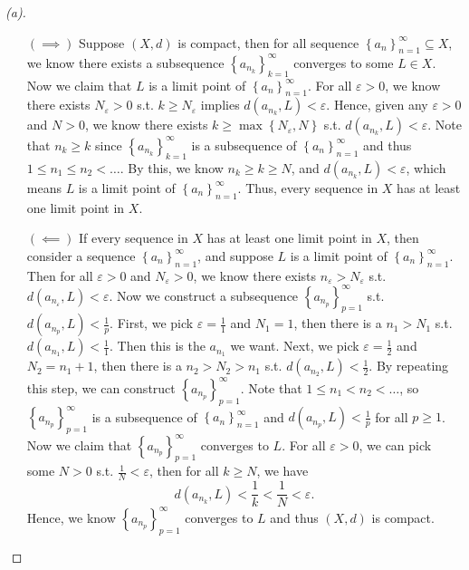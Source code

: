 \begin{proof}[(a)]
  \vphantom{text}
  \begin{itemize}
    \item [\((\implies )\)] Suppose \((X, d)\) is compact, then for all sequence \(\left\{ a_n \right\}_{n=1}^{\infty} \subseteq X \), we know there exists a subsequence \(\left\{ a_{n_k} \right\}_{k=1}^{\infty}  \) converges to some \(L \in X\). Now we claim that \(L\) is a limit point of \(\left\{ a_n \right\}_{n=1}^{\infty}  \). For all \(\varepsilon > 0\), we know there exists \(N_{\varepsilon } > 0\) s.t. \(k \ge N_{\varepsilon }\) implies \(d \left( a_{n_k}, L \right) < \varepsilon  \). Hence, given any \(\varepsilon > 0\) and \(N > 0\), we know there exists \(k \ge \max \left\{ N_{\varepsilon }, N  \right\} \) s.t. \(d \left( a_{n_k}, L \right) < \varepsilon  \). Note that \(n_k \ge k\)  since \(\left\{ a_{n_k} \right\}_{k=1}^{\infty}  \) is a subsequence of \(\left\{ a_n \right\}_{n=1}^{\infty}  \) and thus \(1 \le n_1 \le n_2 < \dots \). By this, we know \(n_k \ge k \ge N\), and \(d \left( a_{n_k}, L \right) < \varepsilon  \), which means \(L\) is a limit point of \(\left\{ a_n \right\}_{n=1}^{\infty}  \). Thus, every sequence in \(X\) has at least one limit point in \(X\).                      
    \item [\((\impliedby )\)] If every sequence in \(X\) has at least one limit point in \(X\), then consider a sequence \(\left\{ a_n \right\}_{n=1}^{\infty}  \), and suppose \(L\) is a limit point of \(\left\{ a_n \right\}_{n=1}^{\infty}  \). Then for all \(\varepsilon > 0\) and \(N_{\varepsilon } > 0 \), we know there exists \(n_{\varepsilon } > N_{\varepsilon }\) s.t. \(d\left( a_{n_{\varepsilon }}, L \right) < \varepsilon \). Now we construct a subsequence \(\left\{ a_{n_p} \right\}_{p=1}^{\infty}  \) s.t. \(d\left( a_{n_p}, L \right) < \frac{1}{p} \). First, we pick \(\varepsilon = \frac{1}{1}\) and \(N_{1 } = 1 \), then there is a \(n_1 > N_{1} \) s.t. \(d\left( a_{n_1}, L \right) < \frac{1}{1} \). Then this is the \(a_{n_1} \) we want. Next, we pick \(\varepsilon = \frac{1}{2}\) and \(N_2 = n_1 + 1\), then there is a \(n_2 > N_2 > n_1\) s.t. \(d \left( a_{n_2}, L \right) < \frac{1}{2} \). By repeating this step, we can construct \(\left\{ a_{n_p} \right\}_{p=1}^{\infty}  \). Note that \(1 \le n_1 < n_2 < \dots \), so \(\left\{ a_{n_p} \right\}_{p=1}^{\infty}  \) is a subsequence of \(\left\{ a_{n} \right\}_{n=1}^{\infty}  \) and \(d\left( a_{n_p}, L \right) < \frac{1}{p}\) for all \(p \ge 1\). Now we claim that \(\left\{ a_{n_p} \right\}_{p=1}^{\infty}  \) converges to \(L\). For all \(\varepsilon > 0\), we can pick some \(N > 0\) s.t. \(\frac{1}{N} < \varepsilon \), then for all \(k \ge N\), we have 
    \[
      d \left( a_{n_k}, L \right) < \frac{1}{k} < \frac{1}{N} < \varepsilon.
    \]
    Hence, we know \(\left\{ a_{n_p} \right\}_{p=1}^{\infty}  \) converges to \(L\) and thus \((X, d)\) is compact.   
  \end{itemize}
\end{proof}
